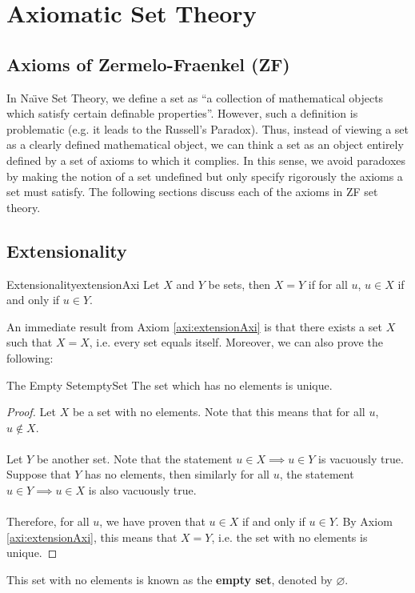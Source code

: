 \documentclass[math]{amznotes}
\theoremstyle{remark}
\begin{document}
\chapter{Axiomatic Set Theory}
\section{Axioms of Zermelo-Fraenkel (ZF)}
In Na\"\i ve Set Theory, we define a set as ``a collection of mathematical objects which satisfy certain definable properties''. However, such a definition is problematic (e.g. it leads to the Russell's Paradox). Thus, instead of viewing a set as a clearly defined mathematical object, we can think a set as an object entirely defined by a set of axioms to which it complies. In this sense, we avoid paradoxes by making the notion of a set undefined but only specify rigorously the axioms a set must satisfy. The following sections discuss each of the axioms in ZF set theory.
\section{Extensionality}
\begin{axibox}{Extensionality}{extensionAxi}
    Let $X$ and $Y$ be sets, then $X = Y$ if for all $u$, $u \in X$ if and only if $u \in Y$.
\end{axibox}
An immediate result from Axiom \ref{axi:extensionAxi} is that there exists a set $X$ such that $X = X$, i.e. every set equals itself. Moreover, we can also prove the following:
\begin{thmbox}{The Empty Set}{emptySet}
    The set which has no elements is unique.
    \tcblower   
    \begin{proof}
        Let $X$ be a set with no elements. Note that this means that for all $u$, $u \notin X$.
        \\\\
        Let $Y$ be another set. Note that the statement $u \in X \implies u \in Y$ is vacuously true. Suppose that $Y$ has no elements, then similarly for all $u$, the statement~$u \in Y \implies u \in X$ is also vacuously true. 
        \\\\
        Therefore, for all $u$, we have proven that $u \in X$ if and only if $u \in Y$. By Axiom \ref{axi:extensionAxi}, this means that $X = Y$, i.e. the set with no elements is unique.
    \end{proof}
\end{thmbox}
This set with no elements is known as the {\color{red} \textbf{empty set}}, denoted by $\varnothing$.
\end{document}
